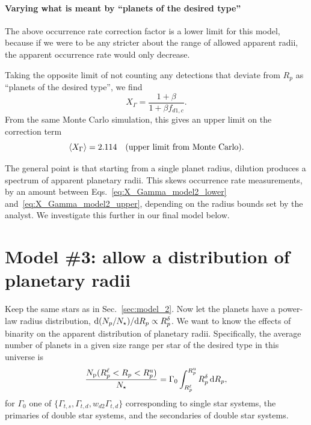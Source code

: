 \documentclass{emulateapj}
\begin{document}

\paragraph{Varying what is meant by ``planets of the desired type'' }
The above occurrence rate correction factor is a lower limit for this model, 
because if we were to be any stricter about the range of allowed apparent 
radii, the apparent occurrence rate would only decrease.

Taking the opposite limit of not counting any detections that deviate 
from $R_p$ as ``planets of the desired type'',
we find
\begin{equation}
X_{\Gamma} = \frac{1 + \beta }{1 + \beta f_{d1,c}}.
\end{equation}
From the same Monte Carlo simulation, this gives an upper limit on the 
correction term
\begin{equation}
\langle X_\Gamma \rangle = 2.114\quad ({\rm upper\ limit\ from\ Monte\ 
Carlo}).
\label{eq:X_Gamma_model2_upper}
\end{equation}

The general point is that starting from a single planet radius, dilution 
produces a spectrum of apparent planetary radii. 
This skews occurrence rate measurements, by an amount between 
Eqs.~\ref{eq:X_Gamma_model2_lower} and~\ref{eq:X_Gamma_model2_upper},
depending on the radius bounds set by the analyst.
We investigate this further in our final model below.


\section{Model \#3: allow a distribution of planetary radii}
\label{sec:model_3}

Keep the same stars as in Sec.~\ref{sec:model_2}.
Now let the planets have a power-law radius distribution, ${\rm 
d}(N_p/N_\star)/{\rm 
d}R_p\propto R_p^\delta$. 
We want to know the effects of binarity on the apparent distribution of 
planetary radii.
Specifically, the average number of planets in a given size range per star of 
the desired type in this universe is
\begin{equation}
\frac{N_{\rm p}(R_p^{\rm \ell}<R_p <R_p^{\rm u})}{N_{\rm \star}} = 
\Gamma_0 \int_{R_p^{\rm \ell}}^{R_p^{\rm u}} R_p^\delta \,{\rm d}R_p,
\end{equation}
for $\Gamma_0$ one of $\{\Gamma_{t,s}, \Gamma_{t,d}, w_{d2}\Gamma_{t,d}\}$
corresponding to single star systems, the primaries of double star systems, 
and the secondaries of double star systems.
\end{document}
